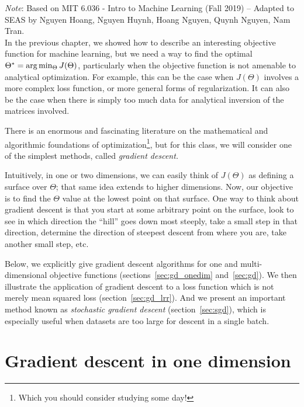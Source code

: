 \documentclass[11pt]{article}
\newcommand{\note}[1]{\todo[color=blue!10,
  linecolor=blue!90,size=\small]{\linespread{0.9}\selectfont{#1}\par}}
\renewcommand{\note}[1]{\footnote{#1}}
\newcommand\argmin[1]{{\rm arg}\min_{#1}}
\begin{document}




\emph{Note}: Based on MIT 6.036 - Intro to Machine Learning (Fall 2019) -- Adapted to SEAS by Nguyen Hoang, Nguyen Huynh, Hoang Nguyen, Quynh Nguyen, Nam Tran.\\

In the previous chapter, 
we showed how to describe an interesting objective function for
machine learning, but we need a way to 
find the optimal $\Theta^* = \argmin{\Theta} J(\Theta)$, particularly
when the objective function is not amenable to analytical
optimization.  For example, this can be the case when $J(\Theta)$
involves a more complex loss function, or more general forms of
regularization.  It can also be the case when there is simply too much
data for analytical inversion of the matrices involved.

There is an
enormous and fascinating literature on the mathematical and algorithmic
foundations of optimization\note{Which you should consider studying
some day!}, but for this class, we will consider one of the simplest
methods, called {\em gradient descent.}  

Intuitively, in one or two dimensions, we can easily think of
$J(\Theta)$ as defining a surface over $\Theta$;  that same idea
extends to higher dimensions.  Now, our objective is to find the
$\Theta$ value at the lowest point on that surface.  One way to think
about gradient descent is that you start at some arbitrary point on
the surface, look to see in which direction the ``hill'' goes down
most steeply, take a small step in that direction, determine the
direction of steepest descent from where you are, take another small
step, etc.  

Below, we explicitly give gradient descent algorithms for one and
multi-dimensional objective functions (sections~\ref{sec:gd_onedim}
and~\ref{sec:gd}).  We then illustrate the application of gradient
descent to a loss function which is not merely mean squared loss
(section~\ref{sec:gd_lrr}).  And we present an important method known
as {\em stochastic gradient descent} (section~\ref{sec:sgd}), which is
especially useful when datasets are too large for descent in a single
batch.

\section{Gradient descent in one dimension}
\end{document}
